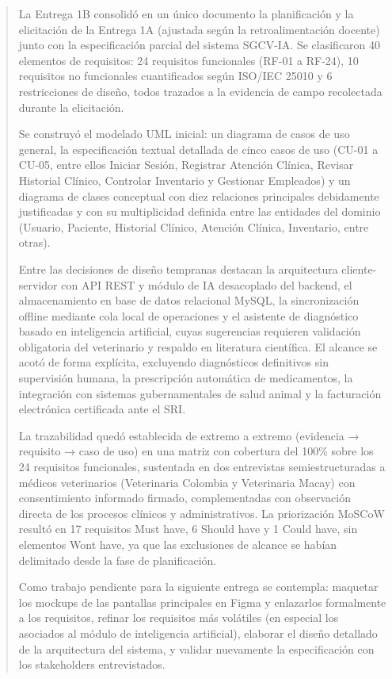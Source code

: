 \documentclass[
]{article}
\begin{document}
\begin{quote}
La Entrega 1B consolidó en un único documento la planificación y la
elicitación de la Entrega 1A (ajustada según la retroalimentación
docente) junto con la especificación parcial del sistema SGCV-IA. Se
clasificaron 40 elementos de requisitos: 24 requisitos funcionales
(RF-01 a RF-24), 10 requisitos no funcionales cuantificados según
ISO/IEC 25010 y 6 restricciones de diseño, todos trazados a la evidencia
de campo recolectada durante la elicitación.

Se construyó el modelado UML inicial: un diagrama de casos de uso
general, la especificación textual detallada de cinco casos de uso
(CU-01 a CU-05, entre ellos Iniciar Sesión, Registrar Atención Clínica,
Revisar Historial Clínico, Controlar Inventario y Gestionar Empleados) y
un diagrama de clases conceptual con diez relaciones principales
debidamente justificadas y con su multiplicidad definida entre las
entidades del dominio (Usuario, Paciente, Historial Clínico, Atención
Clínica, Inventario, entre otras).

Entre las decisiones de diseño tempranas destacan la arquitectura
cliente-servidor con API REST y módulo de IA desacoplado del backend, el
almacenamiento en base de datos relacional MySQL, la sincronización
offline mediante cola local de operaciones y el asistente de diagnóstico
basado en inteligencia artificial, cuyas sugerencias requieren
validación obligatoria del veterinario y respaldo en literatura
científica. El alcance se acotó de forma explícita, excluyendo
diagnósticos definitivos sin supervisión humana, la prescripción
automática de medicamentos, la integración con sistemas gubernamentales
de salud animal y la facturación electrónica certificada ante el SRI.

La trazabilidad quedó establecida de extremo a extremo (evidencia →
requisito → caso de uso) en una matriz con cobertura del 100\% sobre los
24 requisitos funcionales, sustentada en dos entrevistas
semiestructuradas a médicos veterinarios (Veterinaria Colombia y
Veterinaria Macay) con consentimiento informado firmado, complementadas
con observación directa de los procesos clínicos y administrativos. La
priorización MoSCoW resultó en 17 requisitos Must have, 6 Should have y
1 Could have, sin elementos Won\textquotesingle t have, ya que las
exclusiones de alcance se habían delimitado desde la fase de
planificación.

Como trabajo pendiente para la siguiente entrega se contempla: maquetar
los mockups de las pantallas principales en Figma y enlazarlos
formalmente a los requisitos, refinar los requisitos más volátiles (en
especial los asociados al módulo de inteligencia artificial), elaborar
el diseño detallado de la arquitectura del sistema, y validar nuevamente
la especificación con los stakeholders entrevistados.
\end{quote}
\end{document}
